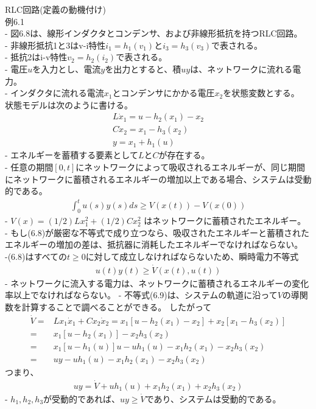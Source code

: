 \documentclass{jsarticle}
\begin{document}
RLC回路(定義の動機付け)\\
例6.1\\
- 図6.8は、線形インダクタとコンデンサ、および非線形抵抗を持つRLC回路。\\
- 非線形抵抗1と3はv-i特性$i_1=h_1(v_1)$と$i_3 =h_3(v_3)$で表される。\\
- 抵抗2はi-v特性$v_2 = h_2(i_2)$で表される。\\
- 電圧$u$を入力とし、電流$y$を出力とすると、積$uy$は、ネットワークに流れる電力。\\
- インダクタに流れる電流$x_1$とコンデンサにかかる電圧$x_2$を状態変数とする。\\
状態モデルは次のように書ける。
\begin{align*}
  L\dot x_1 = u - h_2(x_1)-x_2\\
  C\dot x_2 = x_1-h_3(x_2)\\
  y = x_1+h_1(u)
\end{align*}
- エネルギーを蓄積する要素として$L$と$C$が存在する。\\
- 任意の期間$[0, t]$にネットワークによって吸収されるエネルギーが、同じ期間にネットワークに蓄積されるエネルギーの増加以上である場合、システムは受動的である。
\begin{align}
  \int^t_0 u(s)y(s) ds \geq V(x(t))-V(x(0)) \tag{6.8}
\end{align}
- $V(x) = (1/2)Lx_1^2 + (1/2)Cx_2^2$ はネットワークに蓄積されたエネルギー。\\
- もし(6.8)が厳密な不等式で成り立つなら、吸収されたエネルギーと蓄積されたエネルギーの増加の差は、抵抗器に消耗したエネルギーでなければならない。\\
-(6.8)はすべての$t\geq0$に対して成立しなければならないため、瞬時電力不等式 
\begin{align*}
  u(t)y(t) \geq \dot V(x(t),u(t)) \tag{6.9}
\end{align*}
- ネットワークに流入する電力は、ネットワークに蓄積されるエネルギーの変化率以上でなければならない。
- 不等式(6.9)は、システムの軌道に沿って$V$の導関数を計算することで調べることができる。
したがって 
\begin{align*}
  \dot V =  & Lx_1\dot x_1 + Cx_2 \dot x_2 = x_1[u-h_2(x_1)-x_2]+x_2[x_1-h_3(x_2)]\\
  = & x_1[u-h_2(x_1)] - x_2h_3(x_2)\\
  = & x_1[u-h_1(u)]u-uh_1(u)-x_1h_2(x_1)-x_2h_3(x_2)\\
  = & uy - uh_1(u) - x_1h_2(x_1)-x_2h_3(x_2)
\end{align*}
つまり、
\begin{align*}
  uy = \dot V + uh_1(u) + x_1h_2(x_1) + x_2h_3(x_2)
\end{align*}
- $h_1,h_2,h_3$が受動的であれば、$uy\geq \dot V$であり、システムは受動的である。\\
\end{document}
